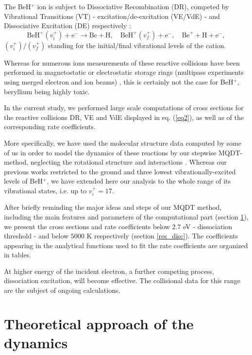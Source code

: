 \documentclass[reviewcopy]{elsarticle}
\begin{document}
The BeH$^{+}$ ion is subject to Dissociative Recombination (DR), competed by Vibrational Transitions (VT) - excitation/de-excitation (VE/VdE) - and 
Dissociative Excitation (DE) respectively \cite{dr2013}:
\begin{equation}\label{eq2}
 \mathrm{BeH}^{+}(v_{i}^{+}) +\mathrm{e^{-}} \longrightarrow  \mathrm{Be + H},\quad \mathrm{BeH}^{+}(v_{f}^{+})+\mathrm{e}^{-},\quad\mathrm{Be}^{+}+\mathrm{H}+\mathrm{e}^{-},
\end{equation}
\noindent
$(v_{i}^{+})/(v_{f}^{+})$ standing for the initial$/$final vibrational levels of the cation.

Whereas for numerous ions measurements of these reactive collisions have been performed in magnetostatic or electrostatic storage rings (multipass experiments using merged electron and ion beams) \cite{dr2013}, this is certainly not the case for BeH$^{+}$, beryllium being highly toxic.

In the current study, we performed large scale computations of cross sections for the reactive collisions 
DR, VE and VdE displayed in eq. (\ref{eq2}), as well as of the corresponding rate coefficients.

More specifically, we have used the molecular structure data computed by some of us 
\cite{roos:09} in order to model the dynamics of these reactions by our
stepwise MQDT-method, neglecting the rotational structure and interactions \cite{Giusti:80,IFS2000a,Valcu1998,niyonzima2013}.
Whereas our previous works \cite{roos:09,niyonzima2013} restricted to the ground and three lowest vibrationally-excited levels of BeH$^{+}$, we have extended here our analysis to the whole range of its vibrational states, i.e. up to $v_{i}^{+}=17$.

After briefly reminding the major ideas and steps of our MQDT method, 
including the main features and parameters of the computational part (section \ref{theoretical}), we present the cross sections and rate coefficients below $2.7$ eV - dissociation threshold -
and below $5000$ K respectively (section \ref{res_disc}). The coefficients appearing in the analytical functions used to
fit the rate coefficients are organized in tables.

At
higher energy of the incident electron, a further competing process,
dissociation excitation, will become effective. The collisional data for this range are the subject of ongoing calculations.

\section{Theoretical approach of the dynamics}\label{theoretical}
\end{document}
